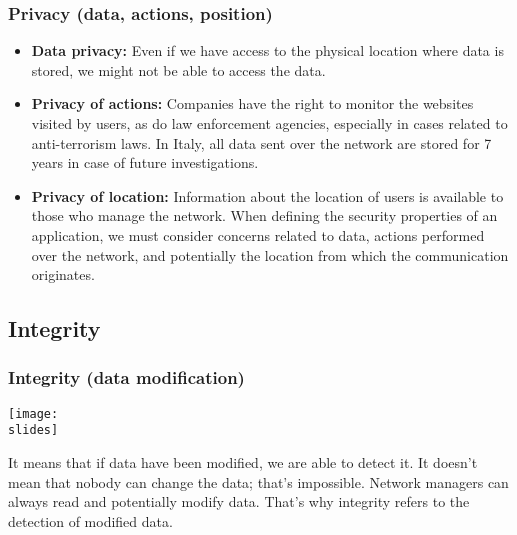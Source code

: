 \subsubsection{Privacy (data, actions, position)}
\begin{itemize}
  \item \textbf{Data privacy:} Even if we have access to the physical location where data is stored, we might not be able to access the data.
  \item \textbf{Privacy of actions:} Companies have the right to monitor the websites visited by users, as do law enforcement agencies, especially in cases related to anti-terrorism laws. In Italy, all data sent over the network are stored for 7 years in case of future investigations.
  \item \textbf{Privacy of location:} Information about the location of users is available to those who manage the network. When defining the security properties of an application, we must consider concerns related to data, actions performed over the network, and potentially the location from which the communication originates.
\end{itemize}



\subsection{Integrity}

\subsubsection{Integrity (data modification)}
\noindent
\begin{minipage}{0.5\textwidth}
  \centering
  \texttt{[image: \\slides]}
\end{minipage}
\hspace{0.05\textwidth}
\begin{minipage}{0.4\textwidth}
  It means that if data have been modified, we are able to detect it. It doesn't mean that nobody can change the data; that's impossible. Network managers can always read and potentially modify data. That's why integrity refers to the detection of modified data.
\end{minipage}

